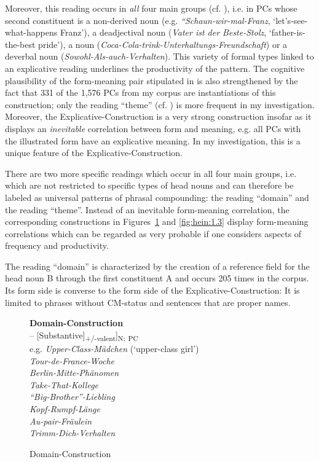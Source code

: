 \documentclass[output=paper]{LSP/langsci}
\begin{document}
Moreover, this reading occurs in \textit{all} four main groups (cf. ), i.e. in PCs whose second constituent is a non-derived noun (e.g. \textit{``Schaun-wir-mal-Franz{\textquotedbl}}, ‘let's-see-what-happens Franz’), a deadjectival noun (\textit{{\textquotedbl}Vater ist der Beste{\textquotedbl}-Stolz}, ‘father-is-the-best pride’), a  noun (\textit{Coca-Cola-trink-Unterhaltungs-Freundschaft}) or a deverbal noun (\textit{Sowohl-Als-auch-Verhalten}). This variety of formal types linked to an explicative reading underlines the productivity of the pattern. The cognitive plausibility of the form-meaning pair stipulated in  is also strengthened by the fact that 331 of the 1,576 PCs from my corpus are instantiations of this construction; only the reading ``theme'' (cf. ) is more frequent in my investigation. Moreover, the Explicative-Construction is a very strong construction insofar as it displays an \textit{inevitable} correlation between form and meaning, e.g. all PCs with the illustrated form have an explicative meaning.  In my investigation, this is a unique feature of the Explicative-Construction. 

There are two more specific readings which occur in all four main groups, i.e. which are not restricted to specific types of head nouns and can therefore be labeled as universal patterns of phrasal compounding: the reading ``domain'' and the reading ``theme''. Instead of an inevitable form-meaning correlation, the corresponding constructions in Figures~\ref{fig:hein:1.2} and \ref{fig:hein:1.3} display form-meaning correlations which can be regarded as very probable if one considers aspects of frequency and productivity.

The reading ``domain'' is characterized by the creation of a reference field for the head noun B through the first constituent A and occurs 205 times in the corpus. Its form side is converse to the form side of the Explicative-Construction: It is limited to phrases without CM-status and sentences that are proper names.

\begin{figure}
\begin{framed}\raggedright
\caption{Domain-Construction\label{fig:hein:1.2}}
\noindent \textbf{Domain-Construction}\\
\noindent [[Phrase\textsubscript{{}-CM}/Sentence\textsubscript{+Proper Name}] -- [Substantive]\textsubscript{+/-valent}]\textsubscript{N;} \textsubscript{PC}\\
\vspace{\baselineskip}
\noindent
e.g. \textit{Upper-Class-Mädchen} (‘upper-class girl')\\
\textit{Tour-de-France-Woche}\\
\textit{Berlin-Mitte-Phänomen}\\
\textit{Take-That-Kollege}\\
\textit{``Big-Brother''-Liebling}\\
\textit{Kopf-Rumpf-Länge}\\
\textit{Au-pair-Fräulein}\\
\textit{Trimm-Dich-Verhalten}
\end{framed}
\end{figure}
\end{document}

